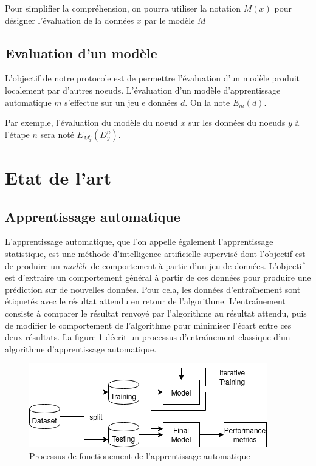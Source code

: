 \documentclass[stage3a]{tnreport} %
\begin{document}
Pour simplifier la compréhension, on pourra utiliser la notation $M(x)$ pour désigner l'évaluation de la données $x$
par le modèle $M$


\subsection{Evaluation d'un modèle}

L'objectif de notre protocole est de permettre l'évaluation d'un modèle produit localement par d'autres noeuds. L'évaluation d'un modèle d'apprentissage automatique $m$ s'effectue sur un jeu e données $d$. On la note $E_m(d)$. 

Par exemple, l'évaluation du modèle du noeud $x$ sur les données du noeuds $y$ à l'étape $n$ sera noté $E_{M_x^n}(D_y^n)$.


\section{Etat de l'art}

\subsection{Apprentissage automatique}

L'apprentissage automatique, que l'on appelle également l'apprentissage statistique, est une méthode d'intelligence artificielle supervisé dont l'objectif est de produire un \textit{modèle} de comportement à partir d'un jeu de données. L'objectif est d'extraire un comportement général à partir de ces données pour produire une prédiction sur de nouvelles données. Pour cela, les données d'entraînement sont étiquetés avec le résultat attendu en retour de l'algorithme. L'entraînement consiste à comparer le résultat renvoyé par l'algorithme au résultat attendu, puis de modifier le comportement de l'algorithme pour minimiser l'écart entre ces deux résultats. La figure \ref{fig:machine_learning_workflow} décrit un processus d'entraînement classique d'un algorithme d'apprentissage automatique.


\begin{figure}[]
  \centering
  \includegraphics[scale=0.8]{figures/machine_workflow.png}
  \caption{Processus de fonctionement de l'apprentissage automatique}
  \label{fig:machine_learning_workflow}
\end{figure}
\end{document}
